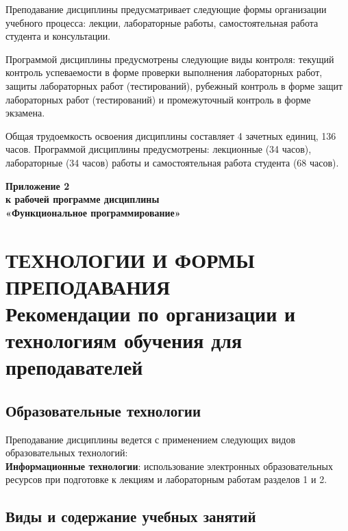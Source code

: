 Преподавание дисциплины предусматривает следующие формы организации учебного процесса: лекции, лабораторные работы, самостоятельная работа студента и консультации.

Программой дисциплины предусмотрены следующие виды контроля: текущий контроль успеваемости в форме
проверки выполнения лабораторных работ, защиты лабораторных работ (тестирований), рубежный контроль в форме защит лабораторных работ (тестирований) и промежуточный контроль в форме экзамена.

Общая трудоемкость освоения дисциплины составляет 4 зачетных единиц, 136 часов. Программой дисциплины предусмотрены: лекционные   (34 часов), лабораторные (34 часов) работы и самостоятельная работа студента (68 часов).

\newpage
\begin{flushright}
\textbf{Приложение 2\\
к рабочей программе дисциплины\\
«Функциональное программирование»}
\end{flushright}

\section*{ТЕХНОЛОГИИ И ФОРМЫ ПРЕПОДАВАНИЯ\\
Рекомендации по организации и технологиям обучения для преподавателей}

\def\thesubsection{\Roman{subsection}}

\subsection{Образовательные технологии}

{\parindent0pt
Преподавание дисциплины ведется с применением следующих видов образовательных технологий:\\
\textbf{Информационные технологии}: использование электронных образовательных ресурсов при подготовке к лекциям и лабораторным работам разделов 1 и 2.

}

\subsection{Виды и содержание учебных занятий}


